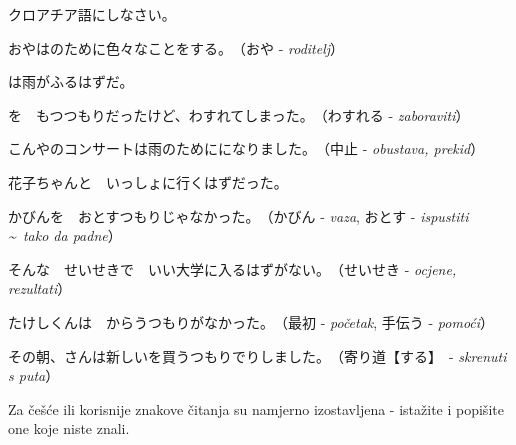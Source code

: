 
\author{Tomislav Mamić}

	
	\begin{mondai}{クロアチア語にしなさい。}
		\itemsep0pt
		\item おやはのために色々なことをする。　（おや - \textit{roditelj}）
		\item {}は雨がふるはずだ。
		\item {}を　もつつもりだったけど、わすれてしまった。　（わすれる - \textit{zaboraviti}）
		\item こんやのコンサートは雨のためにになりました。　（中止 - \textit{obustava, prekid}）
		\item 花子ちゃんと　いっしょに行くはずだった。
		\item かびんを　おとすつもりじゃなかった。　（かびん - \textit{vaza}, おとす - \textit{ispustiti \textasciitilde~tako da padne}）
		\item そんな　せいせきで　いい大学に入るはずがない。　（せいせき - \textit{ocjene, rezultati}）
		\item たけしくんは　からうつもりがなかった。　（最初 - \textit{početak}, 手伝う - \textit{pomoći}）
		\item その朝、さんは新しいを買うつもりでりしました。　（寄り道【する】~- \textit{skrenuti s puta}）
	\end{mondai}

	\vspace{10pt}\noindent
	Za češće ili korisnije znakove čitanja su namjerno izostavljena - istažite i popišite one koje niste znali.
